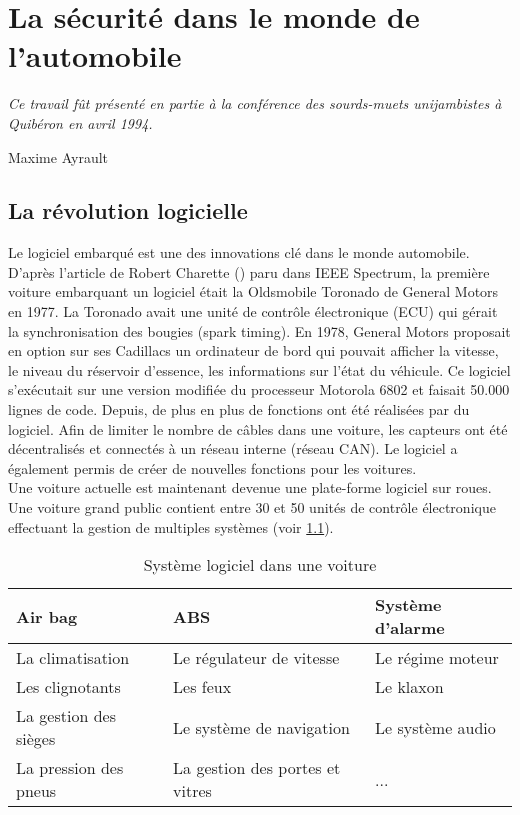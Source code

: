 
\chapter{La s\'ecurit\'e dans le monde de l'automobile} \label{CHAP2}
\smallskip
\hfill
\begin{minipage}[b]{8cm}
{\it Ce travail f\^ut pr\'esent\'e en partie \`a la conf\'erence des sourds-muets unijambistes \`a Quib\'eron en avril 1994.}
\end{minipage}
\begin{flushright} Maxime Ayrault \end{flushright}
\vskip 2cm

\section {La r\'evolution logicielle}
\medskip
{\Huge L}e logiciel embarqu\'e est une des innovations cl\'e dans le monde automobile.
D'apr\`es l'article de Robert Charette (\cite{Cha09}) paru dans IEEE Spectrum, la premi\`ere voiture embarquant un logiciel \'etait la Oldsmobile Toronado de General Motors en 1977. La Toronado avait une unit\'e de contr\^ole \'electronique (ECU) qui g\'erait la synchronisation des bougies (spark timing). En 1978, General Motors proposait en option sur ses Cadillacs un ordinateur de bord qui pouvait afficher la vitesse, le niveau du r\'eservoir d'essence, les informations sur l'\'etat du v\'ehicule. Ce logiciel s'ex\'ecutait sur une version modifi\'ee du processeur Motorola 6802 et faisait 50.000 lignes de code. Depuis, de plus en plus de fonctions ont \'et\'e r\'ealis\'ees par du logiciel. Afin de limiter le nombre de c\^ables dans une voiture, les capteurs ont \'et\'e d\'ecentralis\'es et connect\'es \`a un r\'eseau interne (r\'eseau CAN). Le logiciel a \'egalement permis de cr\'eer de nouvelles fonctions pour les voitures. \\
Une voiture actuelle est maintenant devenue une plate-forme logiciel sur roues. Une voiture grand public contient entre 30 et 50 unit\'es de contr\^ole \'electronique effectuant la gestion de multiples syst\`emes (voir \ref{tab:soft}).

\FloatBarrier
\begin{table}
\centering
\begin{tabular}{| l | l | l |}
\hline
Air bag & ABS & Syst\`eme d'alarme \\
\hline
La climatisation & Le r\'egulateur de vitesse & Le r\'egime moteur \\
\hline
Les clignotants & Les feux & Le klaxon \\
\hline
La gestion des si\`eges & Le syst\`eme de navigation & Le syst\`eme audio \\
\hline
La pression des pneus & La gestion des portes et vitres & ... \\
\hline
\end{tabular}
\caption{Syst\`eme logiciel dans une voiture}
\label{tab:soft}
\end{table}
\FloatBarrier


